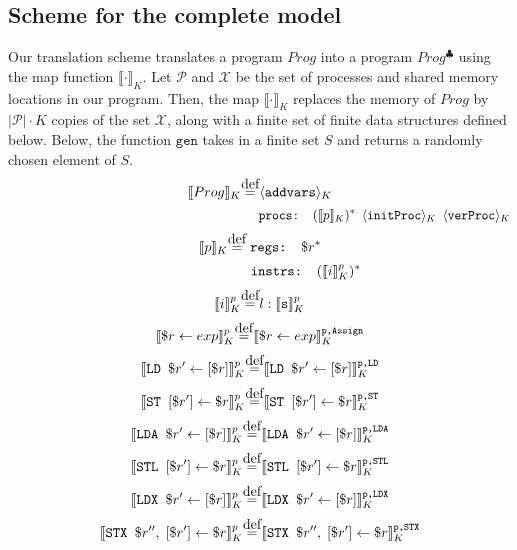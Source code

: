 \documentclass{article}
\newcommand{\var}{\texttt}
\newcommand\myeq{\stackrel{\mathclap{\normalfont\mbox{def}}}{=}}
\begin{document}
\subsection{Scheme for the complete model}
Our translation scheme translates a program $Prog$ into a program $Prog^\clubsuit$ using the map function $\llbracket\cdot\rrbracket_K$. Let $\mathcal{P}$ and $\mathcal{X}$ be the set of processes and shared memory locations in our program. Then, the map $\llbracket\cdot\rrbracket_K$ replaces the memory of $Prog$ by $|\mathcal{P}|\cdot K$ copies of the set $\mathcal{X}$, along with a finite set of finite data structures defined below. Below, the function $\texttt{gen}$ takes in a finite set $S$ and returns a randomly chosen element of $S$.\\
$$\llbracket Prog \rrbracket_K \myeq \langle \texttt{addvars} \rangle_K$$
\vspace{-2em}
$$\qquad\qquad\qquad\kern 13.3em\texttt{procs: }(\llbracket p \rrbracket_K)^* \kern 0.5em \langle \texttt{initProc} \rangle_K \kern 0.5em \langle \texttt{verProc} \rangle_K$$
$$\llbracket p \rrbracket_K \myeq \;\texttt{regs: } \$r^*$$
\vspace{-2em}
$$\qquad\qquad\kern 2.6em\texttt{instrs: } (\llbracket i \rrbracket_K^p)^*$$
$$\llbracket i \rrbracket_K^p \myeq l: \llbracket \texttt{s} \rrbracket_K^p $$
$$\llbracket \$r \leftarrow exp \rrbracket_K^p \myeq \llbracket \$r \leftarrow exp \rrbracket_K^\texttt{p,Assign} $$
\vspace{-1.2em}
$$\llbracket \var{LD } \$r' \leftarrow [\$r] \rrbracket_K^p \myeq \llbracket \var{LD } \$r' \leftarrow [\$r] \rrbracket_K^\texttt{p,LD}$$
\vspace{-1.2em}
$$\llbracket \var{ST } [\$r'] \leftarrow \$r \rrbracket_K^p \myeq \llbracket \var{ST } [\$r'] \leftarrow \$r \rrbracket_K^\texttt{p,ST}$$
\vspace{-1.2em}
$$\llbracket \var{LDA } \$r' \leftarrow [\$r] \rrbracket_K^p \myeq \llbracket \var{LDA } \$r' \leftarrow [\$r] \rrbracket_K^\texttt{p,LDA}$$
\vspace{-1.2em}
$$\llbracket \var{STL } [\$r'] \leftarrow \$r \rrbracket_K^p \myeq \llbracket \var{STL } [\$r'] \leftarrow \$r \rrbracket_K^\texttt{p,STL}$$
\vspace{-1.2em}
$$\llbracket \var{LDX } \$r' \leftarrow [\$r] \rrbracket_K^p \myeq \llbracket \var{LDX } \$r' \leftarrow [\$r] \rrbracket_K^\texttt{p,LDX}$$
\vspace{-1.2em}
$$\llbracket \var{STX } \$r'', \;[\$r'] \leftarrow \$r \rrbracket_K^p \myeq \llbracket \var{STX } \$r'', \;[\$r'] \leftarrow \$r \rrbracket_K^\texttt{p,STX}$$
\end{document}
